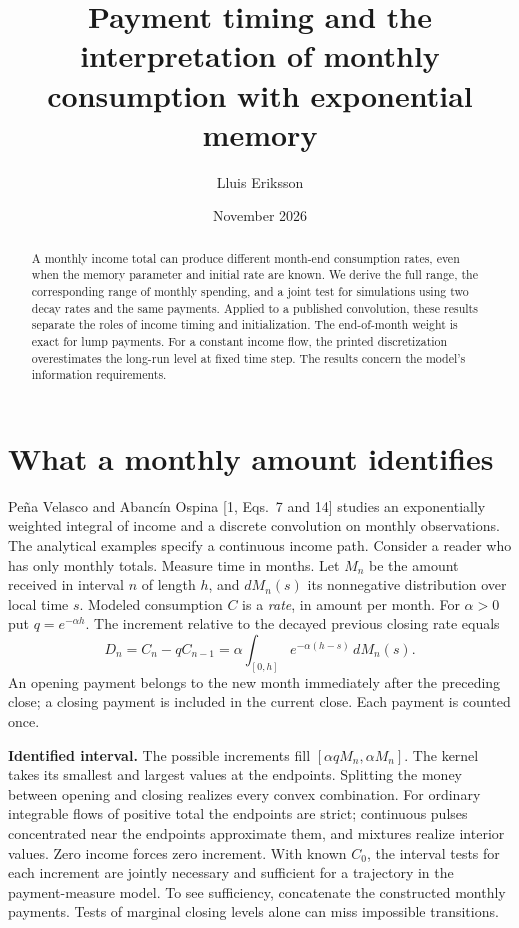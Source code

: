 \documentclass[11pt]{article}
\title{Payment timing and the interpretation of monthly consumption with exponential memory}
\author{Lluis Eriksson}
\date{November 2026}
\begin{document}
\maketitle
\begin{abstract}
A monthly income total can produce different month-end consumption rates, even when the memory parameter and initial rate are known. We derive the full range, the corresponding range of monthly spending, and a joint test for simulations using two decay rates and the same payments. Applied to a published convolution, these results separate the roles of income timing and initialization. The end-of-month weight is exact for lump payments. For a constant income flow, the printed discretization overestimates the long-run level at fixed time step. The results concern the model's information requirements.
\end{abstract}
\section{What a monthly amount identifies}
Pe\~na Velasco and Abanc\'in Ospina [1, Eqs.~7 and 14] studies an exponentially weighted integral of income and a discrete convolution on monthly observations. The analytical examples specify a continuous income path. Consider a reader who has only monthly totals. Measure time in months. Let $M_n$ be the amount received in interval $n$ of length $h$, and $dM_n(s)$ its nonnegative distribution over local time $s$. Modeled consumption $C$ is a \emph{rate}, in amount per month. For $\alpha>0$ put $q=e^{-\alpha h}$. The increment relative to the decayed previous closing rate equals
\[
D_n=C_n-q C_{n-1}=\alpha\int_{[0,h]} e^{-\alpha(h-s)}\,dM_n(s).
\]
An opening payment belongs to the new month immediately after the preceding close; a closing payment is included in the current close. Each payment is counted once.

\textbf{Identified interval.} The possible increments fill $[\alpha q M_n,\alpha M_n]$. The kernel takes its smallest and largest values at the endpoints. Splitting the money between opening and closing realizes every convex combination. For ordinary integrable flows of positive total the endpoints are strict; continuous pulses concentrated near the endpoints approximate them, and mixtures realize interior values. Zero income forces zero increment. With known $C_0$, the interval tests for each increment are jointly necessary and sufficient for a trajectory in the payment-measure model. To see sufficiency, concatenate the constructed monthly payments. Tests of marginal closing levels alone can miss impossible transitions.
\end{document}
